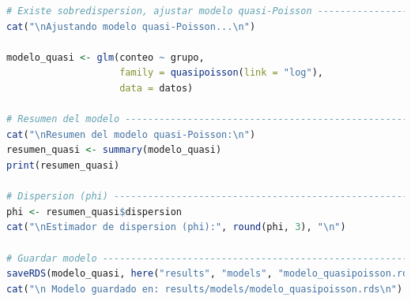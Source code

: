 \begin{lstlisting}[language=R, caption={Script 3: Modelo de Poisson e Inferencia (Inciso b).}, label={lst:script3}]
# Existe sobredispersion, ajustar modelo quasi-Poisson ------------------------
cat("\nAjustando modelo quasi-Poisson...\n")

modelo_quasi <- glm(conteo ~ grupo,
                    family = quasipoisson(link = "log"),
                    data = datos)

# Resumen del modelo ---------------------------------------------------------- 
cat("\nResumen del modelo quasi-Poisson:\n")
resumen_quasi <- summary(modelo_quasi)
print(resumen_quasi)

# Dispersion (phi) ------------------------------------------------------------
phi <- resumen_quasi$dispersion
cat("\nEstimador de dispersion (phi):", round(phi, 3), "\n")

# Guardar modelo --------------------------------------------------------------
saveRDS(modelo_quasi, here("results", "models", "modelo_quasipoisson.rds"))
cat("\n Modelo guardado en: results/models/modelo_quasipoisson.rds\n")
\end{lstlisting}